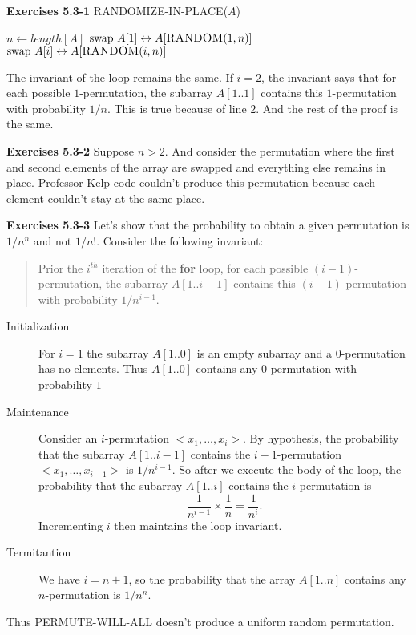 \documentclass[a4paper,12pt]{article}
\newcommand{\newpar}[1]
{\bigskip \noindent \textbf{Exercises #1} \newline}
\newcommand{\la}{\leftarrow}
\begin{document}
\newpar{5.3-1}
\textsc{RANDOMIZE-IN-PLACE}($A$)
\begin{algorithmic}[1]
  \STATE $n \la length[A]$
  \STATE $\mathrm{swap}\ A[1] \leftrightarrow A[\textsc{RANDOM}(1,
    n)]$
  \FOR{$i\la 2$ to $n$}
  \STATE $\mathrm{swap}\ A[i] \leftrightarrow A[\textsc{RANDOM}(i,
    n)]$
  \ENDFOR
\end{algorithmic}
The invariant of the loop remains the same.  If $i=2$, the invariant
says that for each possible $1$-permutation, the subarray $A[1..1]$
contains this $1$-permutation with probability $1/n$.  This is true
because of line $2$.  And the rest of the proof is the same.

\newpar{5.3-2}
Suppose $n > 2$.  And consider the permutation where the first and
second elements of the array are swapped and everything else remains
in place.  Professor Kelp code couldn't produce this permutation
because each element couldn't stay at the same place.

\newpar{5.3-3}
Let's show that the probability to obtain a given permutation is
$1/n^n$ and not $1/n!$.  Consider the following invariant:
\begin{quote}
  Prior the $i^{th}$ iteration of the \textbf{for} loop, for each
  possible $(i-1)$-permutation, the subarray $A[1 .. i-1]$ contains
  this $(i-1)$-permutation with probability $1/n^{i-1}$.
\end{quote}
\begin{description}
\item[Initialization]
  For $i=1$ the subarray $A[1 .. 0]$ is an empty
  subarray and a $0$-permutation has no elements.  Thus $A[1 .. 0]$
  contains any $0$-permutation with probability $1$

\item[Maintenance]
  Consider an $i$-permutation $<x_1,\ldots,x_i>$.
  By hypothesis, the probability that the subarray $A[1.. i-1]$
  contains the $i-1$-permutation $<x_1,\ldots,x_{i-1}>$ is
  $1/n^{i-1}$.  So after we execute the body of the loop, the
  probability that the subarray $A[1 .. i]$ contains the
  $i$-permutation is 
  \[ \frac{1}{n^{i-1}} \times \frac{1}{n} = \frac{1}{n^i}.\]
  Incrementing $i$ then maintains the loop invariant.

\item[Termitantion]
  We have $i = n+1$, so the probability that the array $A[1..n]$
  contains any $n$-permutation is $1/n^n$.
\end{description}
Thus \textsc{PERMUTE-WILL-ALL} doesn't produce a uniform random
permutation.
\end{document}
